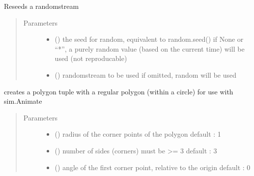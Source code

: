 \documentclass[letterpaper,10pt,english]{sphinxmanual}
\begin{document}

\begin{fulllineitems}
\label{\detokenize{Reference:salabim.random_seed}}
Reseeds a randomstream
\begin{quote}\begin{description}
\item[{Parameters}] \leavevmode\begin{itemize}
\item {} 
 (\sphinxstyleliteralemphasis{, }) \textendash{} the seed for random, equivalent to random.seed() 
if None or “*”, a purely random value (based on the current time) will be used
(not reproducable) 

\item {} 
 () \textendash{} randomstream to be used 
if omitted, random will be used 

\end{itemize}

\end{description}\end{quote}

\end{fulllineitems}


\begin{fulllineitems}
\label{\detokenize{Reference:salabim.regular_polygon}}
creates a polygon tuple with a regular polygon (within a circle) for use with sim.Animate
\begin{quote}\begin{description}
\item[{Parameters}] \leavevmode\begin{itemize}
\item {} 
 () \textendash{} radius of the corner points of the polygon 
default : 1

\item {} 
 () \textendash{} number of sides (corners) 
must be \textgreater{}= 3 
default : 3

\item {} 
 () \textendash{} angle of the first corner point, relative to the origin 
default : 0

\end{itemize}

\end{description}\end{quote}

\end{fulllineitems}
\end{document}
